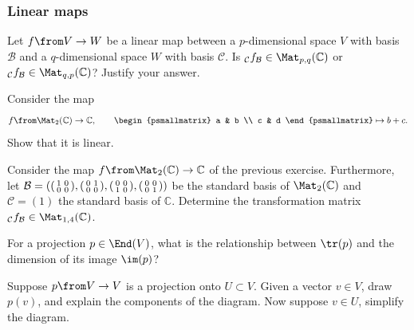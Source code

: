 \documentclass[a4paper,oneside, 12pt]{amsart}
\begin{document}
\subsubsection*{Linear maps}
\begin{thmlist}
  \item Let \(f\from V \to W\) be a linear map between a \(p\)-dimensional space \(V\) with basis \(\mathcal{B}\) and a \(q\)-dimensional space \(W\) with basis \(\mathcal{C}\).
  Is \(_{\mathcal{C}}f_{\mathcal{B}} \in \Mat_{p,q}( \mathbb{C})\) or \(_{\mathcal{C}}f_{\mathcal{B}} \in \Mat_{q,p}( \mathbb{C})\)?
  Justify your answer.
  \item Consider the  map
  \begin{equation*}
    f \from \Mat_2(\mathbb{C}) \to \mathbb{C}, \qquad
    \begin{psmallmatrix}
      a & b \\
      c & d
    \end{psmallmatrix}
    \mapsto
    b+c.
  \end{equation*}
  Show that it is linear.
  \item Consider the map \(f \from \Mat_{2} ( \mathbb{C}) \to \mathbb{C}\) of the previous exercise.
  Furthermore, let \(\mathcal{B} = \left(
    \begin{psmallmatrix}
      1 & 0 \\ 0 & 0
    \end{psmallmatrix},
    \begin{psmallmatrix}
      0 & 1 \\ 0 & 0
    \end{psmallmatrix},
    \begin{psmallmatrix}
      0 & 0 \\ 1 & 0
    \end{psmallmatrix},
    \begin{psmallmatrix}
      0 & 0 \\ 0 & 1
    \end{psmallmatrix}
  \right)\) be the standard basis of \(\Mat_2(\mathbb{C})\) and \( \mathcal{C}= (1)\)  the standard basis of \( \mathbb{C}\).
  Determine the transformation matrix \(_{ \mathcal{C}}f_{\mathcal{B}}\in \Mat_{1,4}( \mathbb{C})\).
  \item For a projection \(p \in \End(V)\), what is the relationship between \(\tr(p)\) and the dimension of its image \(\im(p)\)?
  \item Suppose \(p\from V\to V\) is a projection onto \(U\subset V\). Given a vector \(v\in V\), draw \(p(v)\),
  and explain the components of the diagram. Now suppose \(v\in U\), simplify the diagram.
\end{thmlist}
\cleardoublepage
\end{document}
